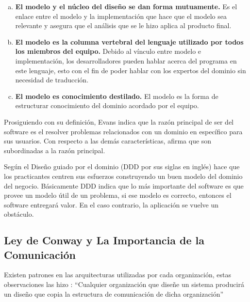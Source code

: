 \vspace{-1em}
\begin{enumerate}[a.]
  \item \textbf{El modelo y el núcleo del diseño se dan forma mutuamente.}
    Es el enlace entre el modelo y la implementación que hace que el modelo sea relevante y asegura que el
    análisis que se le hizo aplica al producto final.
  \item \textbf{El modelo es la columna vertebral del lenguaje utilizado por todos los miembros del equipo.}
    Debido al vínculo entre modelo e implementación, los desarrolladores pueden hablar acerca del
    programa en este lenguaje, esto con el fin de poder hablar con los expertos del dominio sin
    necesidad de traducción.
  \item \textbf{El modelo es conocimiento destilado.}
    El modelo es la forma de estructurar conocimiento del dominio acordado por el equipo.
\end{enumerate}
\vspace{-1em}

Prosiguiendo con su definición, Evans indica que la razón principal de ser del software es el
resolver problemas relacionados con un dominio en específico para sus usuarios.
Con respecto a las demás características, afirma que son subordinadas a la razón principal.

Según \cite{percival2020architecture} el Diseño guiado por el dominio (DDD por sus siglas en inglés)
hace que los practicantes centren sus esfuerzos construyendo un buen modelo del dominio del negocio.
Básicamente DDD indica que lo más importante del software es que provee un modelo útil de un problema,
si ese modelo es correcto, entonces el software entregará valor.
En el caso contrario, la aplicación se vuelve un obstáculo.


\subsection{Ley de Conway y La Importancia de la Comunicación}

Existen patrones en las arquitecturas utilizadas por cada organización, estas observaciones
las hizo \cite{conway1968committees}: ``Cualquier organización que diseñe un sistema producirá
un diseño que copia la estructura de comunicación de dicha organización''


